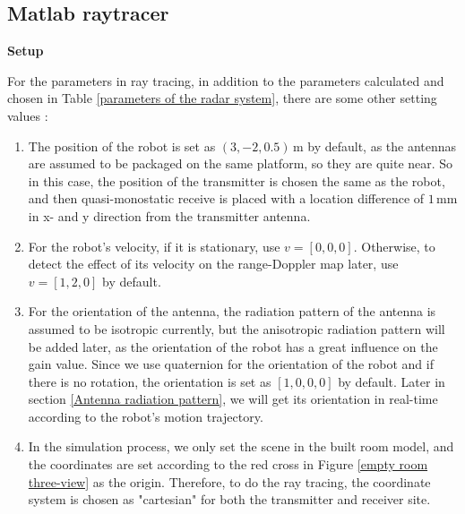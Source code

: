 \documentclass[12pt,DIV14,BCOR12mm,a4paper,footinclude=false,headinclude,parskip=half-,twoside,openright,cleardoublepage=empty,toc=index,bibliography=totoc,listof=totoc]{scrreprt}
\numberwithin{equation}{chapter}
\begin{document}
\subsection{Matlab raytracer} \label{Matlab raytracer}

\begin{spacing}{1.5}
\textbf{\large{Setup}}
\end{spacing}

For the parameters in ray tracing, in addition to the parameters calculated and chosen in Table \ref{parameters of the radar system}, there are some other setting values \cite{raytracer_input}:

\begin{enumerate}[label=\textbullet]
    \item The position of the robot is set as $(3, -2, 0.5)\,\mathrm{m}$ by default, as the antennas are assumed to be packaged on the same platform, so they are quite near. So in this case, the position of the transmitter is chosen the same as the robot, and then quasi-monostatic receive is placed with a location difference of $1\,\mathrm{mm}$ in x- and y direction from the transmitter antenna.

    \item For the robot's velocity, if it is stationary, use $v = [0, 0, 0]$. Otherwise, to detect the effect of its velocity on the range-Doppler map later, use $v = [1, 2, 0]$ by default.

    \item For the orientation of the antenna, the radiation pattern of the antenna is assumed to be isotropic currently, but the anisotropic radiation pattern will be added later, as the orientation of the robot has a great influence on the gain value. Since we use quaternion for the orientation of the robot and if there is no rotation, the orientation is set as $[1, 0, 0, 0]$ by default. Later in section \ref{Antenna radiation pattern}, we will get its orientation in real-time according to the robot's motion trajectory.

    \item In the simulation process, we only set the scene in the built room model, and the coordinates are set according to the red cross in Figure \ref{empty room three-view} as the origin. Therefore, to do the ray tracing, the coordinate system is chosen as "cartesian" for both the transmitter and receiver site.


\end{enumerate}
\end{document}
